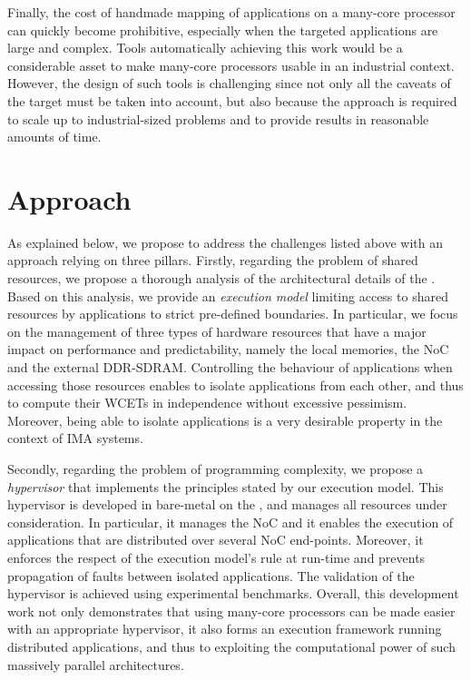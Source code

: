 \documentclass[main.tex]{subfiles}
\begin{document}
Finally, the cost of handmade mapping of applications on a many-core processor can quickly become prohibitive, especially when the targeted applications are large and complex. Tools automatically achieving this work would be a considerable asset to make many-core processors usable in an industrial context. However, the design of such tools is challenging since not only all the caveats of the target must be taken into account, but also because the approach is required to scale up to industrial-sized problems and to provide results in reasonable amounts of time.\\


\section{Approach}
As explained below, we propose to address the challenges listed above with an approach relying on three pillars. Firstly, regarding the problem of shared resources, we propose a thorough analysis of the architectural details of the \mppalong. Based on this analysis, we provide an \emph{execution model} limiting access to shared resources by applications to strict pre-defined boundaries. In particular, we focus on the management of three types of hardware resources that have a major impact on performance and predictability, namely the local memories, the NoC and the external DDR-SDRAM. Controlling the behaviour of applications when accessing those resources enables to isolate applications from each other, and thus to compute their WCETs in independence without excessive pessimism. Moreover, being able to isolate applications is a very desirable property in the context of IMA systems.

Secondly, regarding the problem of programming complexity, we propose a \emph{hypervisor} that implements the principles stated by our execution model. This hypervisor is developed in bare-metal on the \mppalong, and manages all resources under consideration. In particular, it manages the NoC and it enables the execution of applications that are distributed over several NoC end-points. Moreover, it enforces the respect of the execution model's rule at run-time and prevents propagation of faults between isolated applications. The validation of the hypervisor is achieved using experimental benchmarks. Overall, this development work not only demonstrates that using many-core processors can be made easier with an appropriate hypervisor, it also forms an execution framework running distributed applications, and thus to exploiting the computational power of such massively parallel architectures.
\end{document}
